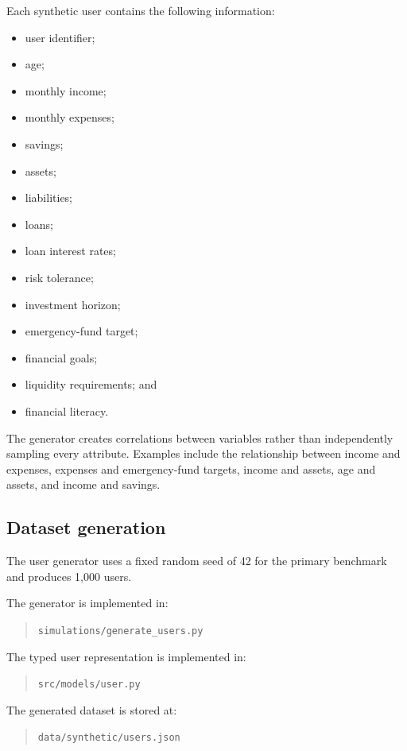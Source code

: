 \documentclass[12pt,a4paper]{article}
\begin{document}
Each synthetic user contains the following information:
\begin{itemize}
    \item user identifier;
    \item age;
    \item monthly income;
    \item monthly expenses;
    \item savings;
    \item assets;
    \item liabilities;
    \item loans;
    \item loan interest rates;
    \item risk tolerance;
    \item investment horizon;
    \item emergency-fund target;
    \item financial goals;
    \item liquidity requirements; and
    \item financial literacy.
\end{itemize}

The generator creates correlations between variables rather than independently sampling every attribute. Examples include the relationship between income and expenses, expenses and emergency-fund targets, income and assets, age and assets, and income and savings.

\subsection{Dataset generation}

The user generator uses a fixed random seed of 42 for the primary benchmark and produces 1,000 users.

The generator is implemented in:

\begin{quote}
\texttt{simulations/generate\_users.py}
\end{quote}

The typed user representation is implemented in:

\begin{quote}
\texttt{src/models/user.py}
\end{quote}

The generated dataset is stored at:

\begin{quote}
\texttt{data/synthetic/users.json}
\end{quote}
\end{document}
